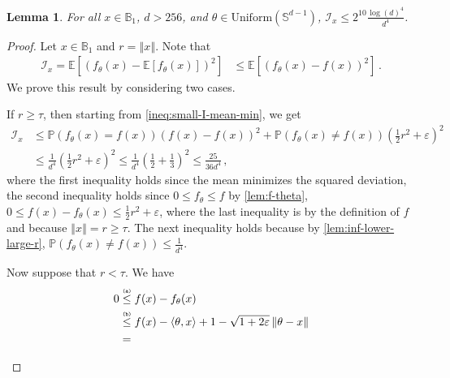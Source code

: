 \documentclass[letter, 12pt]{report}
\newcommand{\explan}[1]{\stackrel{\text{\tiny \texttt{#1}}}}
\newcommand{\ip}[1]{\left \langle #1 \right \rangle}
\newcommand{\ball}{\mathbb{B}}
\newcommand{\paren}[1]{\left( #1 \right)}
\newcommand{\brak}[1]{\left[ #1 \right]}
\newcommand{\norm}[1]{\left \Vert  #1 \right \Vert}
\newcommand{\E}{\mathbb E}
\newcommand{\cI}{\mathcal I}
\newcommand{\I}{\mathcal{I}}
\newcommand{\1}{\mathbf{1}}
\newcommand{\mP}{\mathbb{P}}
\renewcommand{\epsilon}{\varepsilon}
\theoremstyle{plain}
\newtheorem{lemma}[theorem]{Lemma}
\theoremstyle{definition}
\theoremstyle{remark}
\begin{document}
\begin{lemma}\label{lem:small-I-anyr}
    For all $x \in \mathbb{B}_1$, $d > 256$,
    and $\theta \in \text{Uniform}(\mathbb{S}^{d-1})$,
    $\I_x \leq 2^{10} \frac{\log(d)^4}{d^4}$.
\end{lemma}
\begin{proof}
    Let $x \in \ball_1$ and $r = \norm{x}$.
    Note that
    \begin{align}
        \cI_x = \E\brak{
            \paren{f_\theta(x) - \E\brak{f_\theta(x)}}^2
        }
         & \leq
        \E\brak{
            \paren{f_\theta(x) - f(x)}^2
        }\,.
        \label{ineq:small-I-mean-min}
    \end{align}
    We prove this result by considering two cases.
    \begin{enumcases}
        \item If $r \geq \tau$, then starting from \cref{ineq:small-I-mean-min}, we get
        \begin{align}
            \I_x & \leq
            \mP\paren{f_\theta(x) = f(x)}
            \paren{f(x) - f(x)}^2
            +
            \mP\paren{f_\theta(x) \neq f(x)}
            \paren{\frac12 r^2 + \epsilon}^2
            \nonumber
            \\
                 & \leq
            \frac{1}{d^4}\paren{\frac12 r^2 + \epsilon}^2
            \leq
            \frac{1}{d^4}\paren{\frac12 + \frac13}^2
            \leq
            \frac{25}{36d^4}
            \, ,\nonumber
        \end{align}
        where the first inequality holds since the mean minimizes the squared deviation,
        the second inequality holds since
        $0 \leq f_\theta \leq f$ by \cref{lem:f-theta},
        $0 \leq f(x) - f_\theta(x) \leq \frac12 r^2 + \epsilon$,
        where the last inequality is by the definition of $f$ and because $\norm{x}=r\geq \tau$.
        The next inequality holds because by \cref{lem:inf-lower-large-r},
        $\mP(f_\theta(x) \neq f(x)) \leq \frac{1}{d^4}$.
        \item Now suppose that $r < \tau$.
        We have
        \begin{align*}
            0
             &
            \explan{(a)}
            \leq
            f(x) - f_\theta(x)
            \\
             &
            \explan{(b)}
            \leq
            f(x)
            - \ip{\theta, x} + 1 - \sqrt{1 + 2\epsilon}\norm{\theta - x}
            \\
             & =

\end{align*}
\end{enumcases}
\end{proof}
\end{document}
